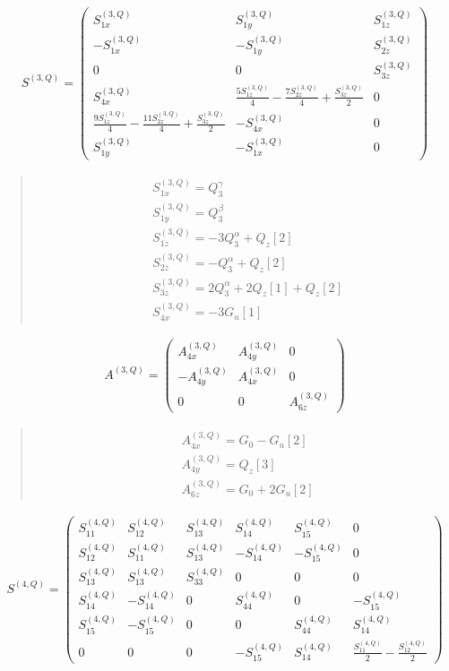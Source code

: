 \documentclass[fleqn,10pt]{jsarticle}
\begin{document}
\begin{align*}
S^{(3,Q)} = \begin{pmatrix} S^{(3,Q)}_{1x} & S^{(3,Q)}_{1y} & S^{(3,Q)}_{1z} \\ - S^{(3,Q)}_{1x} & - S^{(3,Q)}_{1y} & S^{(3,Q)}_{2z} \\ 0 & 0 & S^{(3,Q)}_{3z} \\ S^{(3,Q)}_{4x} & \frac{5 S^{(3,Q)}_{1z}}{4} - \frac{7 S^{(3,Q)}_{2z}}{4} + \frac{S^{(3,Q)}_{3z}}{2} & 0 \\ \frac{9 S^{(3,Q)}_{1z}}{4} - \frac{11 S^{(3,Q)}_{2z}}{4} + \frac{S^{(3,Q)}_{3z}}{2} & - S^{(3,Q)}_{4x} & 0 \\ S^{(3,Q)}_{1y} & - S^{(3,Q)}_{1x} & 0 \end{pmatrix}
\end{align*}
\begin{quote}
\begin{align*}
& S^{(3,Q)}_{1x} = Q_{3}^{\gamma} \\
& S^{(3,Q)}_{1y} = Q_{3}^{\beta} \\
& S^{(3,Q)}_{1z} = - 3 Q_{3}^{\alpha} + Q_{z}[2] \\
& S^{(3,Q)}_{2z} = - Q_{3}^{\alpha} + Q_{z}[2] \\
& S^{(3,Q)}_{3z} = 2 Q_{3}^{\alpha} + 2 Q_{z}[1] + Q_{z}[2] \\
& S^{(3,Q)}_{4x} = - 3 G_{u}[1]
\end{align*}
\end{quote}
\begin{align*}
A^{(3,Q)} = \begin{pmatrix} A^{(3,Q)}_{4x} & A^{(3,Q)}_{4y} & 0 \\ - A^{(3,Q)}_{4y} & A^{(3,Q)}_{4x} & 0 \\ 0 & 0 & A^{(3,Q)}_{6z} \end{pmatrix}
\end{align*}
\begin{quote}
\begin{align*}
& A^{(3,Q)}_{4x} = G_{0} - G_{u}[2] \\
& A^{(3,Q)}_{4y} = Q_{z}[3] \\
& A^{(3,Q)}_{6z} = G_{0} + 2 G_{u}[2]
\end{align*}
\end{quote}
\begin{align*}
S^{(4,Q)} = \begin{pmatrix} S^{(4,Q)}_{11} & S^{(4,Q)}_{12} & S^{(4,Q)}_{13} & S^{(4,Q)}_{14} & S^{(4,Q)}_{15} & 0 \\ S^{(4,Q)}_{12} & S^{(4,Q)}_{11} & S^{(4,Q)}_{13} & - S^{(4,Q)}_{14} & - S^{(4,Q)}_{15} & 0 \\ S^{(4,Q)}_{13} & S^{(4,Q)}_{13} & S^{(4,Q)}_{33} & 0 & 0 & 0 \\ S^{(4,Q)}_{14} & - S^{(4,Q)}_{14} & 0 & S^{(4,Q)}_{44} & 0 & - S^{(4,Q)}_{15} \\ S^{(4,Q)}_{15} & - S^{(4,Q)}_{15} & 0 & 0 & S^{(4,Q)}_{44} & S^{(4,Q)}_{14} \\ 0 & 0 & 0 & - S^{(4,Q)}_{15} & S^{(4,Q)}_{14} & \frac{S^{(4,Q)}_{11}}{2} - \frac{S^{(4,Q)}_{12}}{2} \end{pmatrix}
\end{align*}
\end{document}
